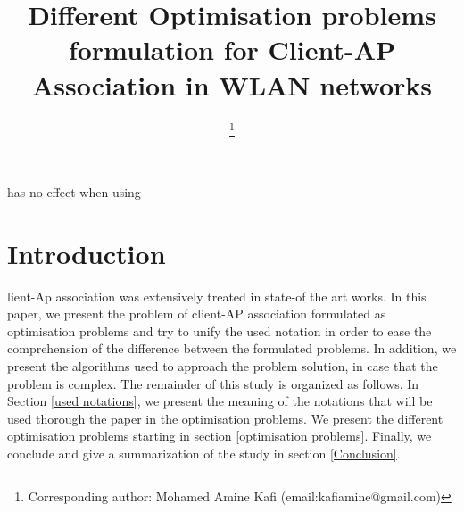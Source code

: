 \documentclass[journal,transmag]{IEEEtran}
\begin{document}
\title{Different Optimisation problems formulation for Client-AP  Association in WLAN networks}

\author{

\thanks{%
Corresponding author: Mohamed Amine Kafi (email:kafiamine@gmail.com)}}




\maketitle

\IEEEdisplaynontitleabstractindextext
 \IEEEdisplaynontitleabstractindextext has no effect when using

\IEEEpeerreviewmaketitle

\section{Introduction}
lient-Ap association was extensively treated in state-of the art works.     
In this paper, we present the problem of client-AP association formulated as optimisation problems and try to unify the used notation in order to ease the comprehension of the difference between the formulated problems. In addition, we present the algorithms used to approach the problem solution, in case that the problem is complex. 
The remainder of this study is organized as follows. In Section \ref{used notations}, we present the meaning of the notations that will be used thorough the paper in the optimisation problems. We present the different optimisation problems starting in section \ref{optimisation problems}. Finally, we conclude and give a summarization of the study in section \ref{Conclusion}.
\end{document}
